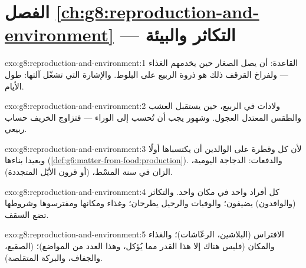 \section*{الفصل \ref{ch:g8:reproduction-and-environment} --- التكاثر والبيئة}

\begin{solution}{exo:g8:reproduction-and-environment:1}
القاعدة: أن يصل الصغار حين يخدمهم الغذاء  --- ولفراخ القرقف
ذلك هو ذروة  الربيع على البلوط. والإشارة التي تشغّل آلتها:
طول الأيام.
\end{solution}

\begin{solution}{exo:g8:reproduction-and-environment:2}
ولادات في الربيع، حين يستقبل العشب والطقس المعتدل العجول. وشهور
 يجب أن تُحسب إلى الوراء --- فتزاوج الخريف حساب ربيعي.
\end{solution}

\begin{solution}{exo:g8:reproduction-and-environment:3}
لأن كل   وقطرة   على الوالدين أن يكتسباها
أولًا ويعيدا بناءها
(\cref{def:g6:matter-from-food:production}). والدفعات: 
الدجاجة اليومية،   الزان في سنة المسْط،   (أو
قرون الأيّل المتجددة).
\end{solution}

\begin{solution}{exo:g8:reproduction-and-environment:4}
كل أفراد  واحد في مكان واحد. والتكاثر (والوافدون) يضيفون؛
والوفيات والرحيل يطرحان؛ وغذاء  ومكانها ومفترسوها وشروطها
تضع السقف.
\end{solution}

\begin{solution}{exo:g8:reproduction-and-environment:5}
الافتراس (البلاشين،  الرعّاشات)؛ والغذاء والمكان (فليس هناك
إلا هذا القدر مما يُؤكل، وهذا العدد من المواضع)؛  (الصقيع،
والجفاف، والبركة المتقلصة).
\end{solution}

